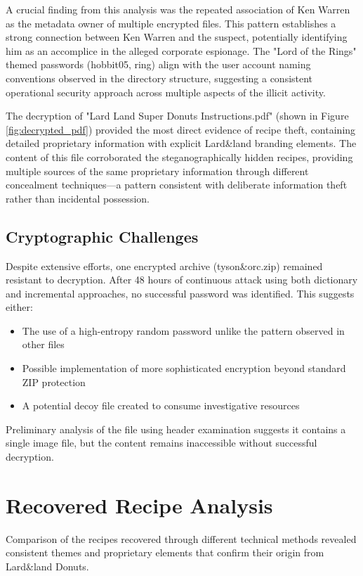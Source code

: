 A crucial finding from this analysis was the repeated association of Ken Warren as the metadata owner of multiple encrypted files. This pattern establishes a strong connection between Ken Warren and the suspect, potentially identifying him as an accomplice in the alleged corporate espionage. The "Lord of the Rings" themed passwords (hobbit05, ring) align with the user account naming conventions observed in the directory structure, suggesting a consistent operational security approach across multiple aspects of the illicit activity.

The decryption of "Lard Land Super Donuts Instructions.pdf" (shown in Figure \ref{fig:decrypted_pdf}) provided the most direct evidence of recipe theft, containing detailed proprietary information with explicit Lard\&land branding elements. The content of this file corroborated the steganographically hidden recipes, providing multiple sources of the same proprietary information through different concealment techniques—a pattern consistent with deliberate information theft rather than incidental possession.

\subsection{Cryptographic Challenges}
Despite extensive efforts, one encrypted archive (tyson\&orc.zip) remained resistant to decryption. After 48 hours of continuous attack using both dictionary and incremental approaches, no successful password was identified. This suggests either:

\begin{itemize}
    \item The use of a high-entropy random password unlike the pattern observed in other files
    \item Possible implementation of more sophisticated encryption beyond standard ZIP protection
    \item A potential decoy file created to consume investigative resources
\end{itemize}

Preliminary analysis of the file using header examination suggests it contains a single image file, but the content remains inaccessible without successful decryption.

\section{Recovered Recipe Analysis}
Comparison of the recipes recovered through different technical methods revealed consistent themes and proprietary elements that confirm their origin from Lard\&land Donuts.

